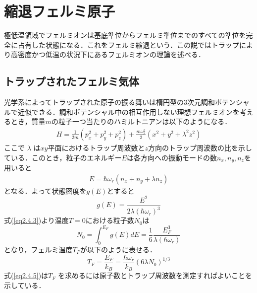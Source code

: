 \documentclass[11pt,a4j,notitlepage]{jreport}
\begin{document}
\section{縮退フェルミ原子}
極低温領域でフェルミオンは基底準位からフェルミ準位までのすべての準位を完全に占有した状態になる．これをフェルミ縮退という．この説ではトラップにより高密度かつ低温の状況下にあるフェルミオンの理論を述べる\cite{InaD}\cite{Miyato}\cite{demarco}．

\subsection{トラップされたフェルミ気体}
光学系によってトラップされた原子の振る舞いは楕円型の3次元調和ポテンシャルで近似できる．調和ポテンシャル中の相互作用しない理想フェルミオンを考えるとき，質量$m$の粒子一つ当たりのハミルトニアンは以下のようになる．
\begin{align}
 	H = \frac{1}{2m}\left(p_{x}^{2}+p_{y}^{2}+p_{z}^{2}\right)+\frac{m \omega_{r}^{2}}{2}\left(x^{2}+y^{2}+\lambda^{2} z^{2}\right)
	\label{eq2.4.1}
\end{align}
ここで $\lambda$ は$xy$平面におけるトラップ周波数と$z$方向のトラップ周波数の比を示している．このとき，粒子のエネルギー$E$は各方向への振動モードの数$n_x, n_y, n_z$を用いると
\begin{align}
 	E = \hbar \omega_{r} \left( n_x + n_y + \lambda n_z \right)
	\label{eq2.4.2}
\end{align}
となる．よって状態密度を$g(E)$とすると
\begin{equation}
	g(E)=\frac{E^{2}}{2 \lambda\left(\hbar \omega_{r}\right)^{3}}
	\label{eq2.4.3}
\end{equation}
式(\ref{eq2.4.3})より温度$T=0$における粒子数$N_0$は
\begin{equation}
	N_0=\int_{0}^{E_{F}} g(E) d E = \frac{1}{6} \frac{E_F^3}{\lambda (\hbar \omega_r)}
	\label{eq2.4.4}
\end{equation}
となり，フェルミ温度$T_F$が以下のように表せる．
\begin{equation}
	T_{F}=\frac{E_{F}}{k_{B}}=\frac{\hbar \omega_{r}}{k_{B}}(6 \lambda N_0)^{1 / 3}
	\label{eq2.4.5}
\end{equation}
式(\ref{eq2.4.5})は$T_F$ を求めるには原子数とトラップ周波数を測定すればよいことを示している．
\end{document}
